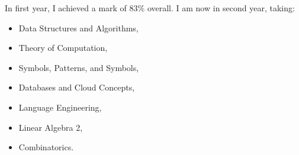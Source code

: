 \documentclass[10pt,a4paper,ragged2e,table]{altacv}
\begin{document}

\begin{fullwidth}
\makecvheader
\end{fullwidth}



In first year, I achieved a mark of 83\% overall. I am now in 
second year, taking: \begin{multicols}{2}
  \begin{itemize}
    \item Data Structures and Algorithms,
    \item Theory of Computation,
    \item Symbols, Patterns, and Symbols,
    \item Databases and Cloud Concepts,
  \end{itemize}
  \columnbreak
  \begin{itemize}
    \item Language Engineering,
    \item Linear Algebra 2,
    \item Combinatorics.
  \end{itemize}
\end{multicols}

\divider

\end{document}
